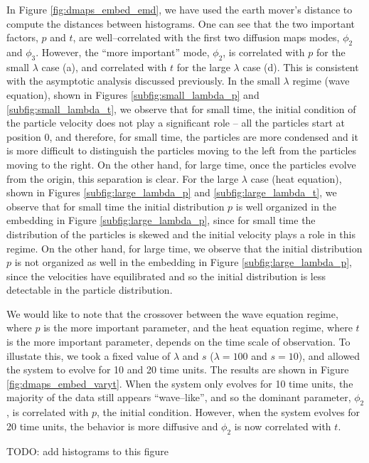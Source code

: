 \documentclass[prl, reprint, final]{revtex4-1}
\begin{document}
In Figure \ref{fig:dmaps_embed_emd}, we have used the earth mover's distance to compute the distances between histograms.
%
One can see that the two important factors, $p$ and $t$, are well--correlated with the first two diffusion maps modes, $\phi_2$ and $\phi_3$. 
%
However, the ``more important'' mode, $\phi_2$, is correlated with $p$ for the small $\lambda$ case (a), and correlated with $t$ for the large $\lambda$ case (d). This is consistent with the asymptotic analysis discussed previously. 
%
In the small $\lambda$ regime (wave equation), shown in Figures \ref{subfig:small_lambda_p} and \ref{subfig:small_lambda_t}, we observe that for small time, the initial condition of the particle velocity does not play a significant role -- all the particles start at position $0$, and therefore, for small time, the particles are more condensed and it is more difficult to distinguish the particles moving to the left from the particles moving to the right. On the other hand, for large time, once the particles evolve from the origin, this separation is clear.  
%
For the large $\lambda$ case (heat equation), shown in Figures \ref{subfig:large_lambda_p} and \ref{subfig:large_lambda_t}, we observe that for small time the initial distribution $p$ is well organized in the embedding in Figure \ref{subfig:large_lambda_p}, since for small time the distribution of the particles is skewed and the initial velocity plays a role in this regime. 
%
On the other hand, for large time, we observe that the initial distribution $p$ is not organized as well in the embedding in Figure \ref{subfig:large_lambda_p}, since the velocities have equilibrated and so the initial distribution is less detectable in the particle distribution.

We would like to note that the crossover between the wave equation regime, where $p$ is the more important parameter, and the heat equation regime, where $t$ is the more important parameter, depends on the time scale of observation.
%
To illustate this, we took a fixed value of $\lambda$ and $s$ ($\lambda=100$ and $s=10$), and allowed the system to evolve for 10 and 20 time units. 
%
The results are shown in Figure \ref{fig:dmaps_embed_varyt}.
%
When the system only evolves for 10 time units, the majority of the data still appears ``wave--like'', and so the dominant parameter, $\phi_2$, is correlated with $p$, the initial condition.
%
However, when the system evolves for 20 time units, the behavior is more diffusive and $\phi_2$ is now correlated with $t$. 

TODO: add histograms to this figure
\end{document}
